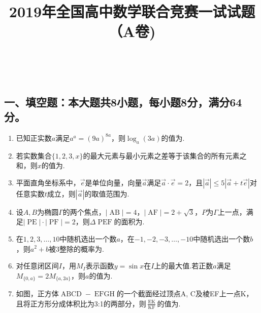 \documentclass[UTF8]{ctexart}
\newcommand{\tmop}[1]{\ensuremath{\operatorname{#1}}}
\begin{document}
\

\title{2019年全国高中数学联合竞赛一试试题（A卷)}

\maketitle

\subsection*{一、填空题：本大题共8小题，每小题8分，满分64分。}

\begin{enumerate}
  \item 已知正实数$a$满足$a^a = (9 a)^{8 a}$，则$\log_a (3
  a)$的值为{\underline{{\hspace{3em}}}}.
  
  \item 若实数集合$\{ 1, 2, 3, x
  \}$的最大元素与最小元素之差等于该集合的所有元素之和，则$x$的值为{\underline{{\hspace{3em}}}}.
  
  \item
  平面直角坐标系中，$\vec{e}$是单位向量，向量$\vec{a}$满足$\vec{a}
  \cdot \vec{e} = 2$，且$| \vec{a} | \leqslant 5 | \vec{a} + t \vec{e}
  |$对任意实数$t$成立，则$| \vec{a}
  |$的取值范围为{\underline{{\hspace{3em}}}}.
  
  \item 设$A, B$为椭圆$\Gamma$的两个焦点，$| \tmop{AB} | = 4$，$|
  \tmop{AF} | = 2 + \sqrt{3}$，$P$为$\Gamma$上一点，满足$| \tmop{PE} |
  \cdot | \tmop{PF} | = 2$，则$\Delta
  \tmop{PEF}$的面积为{\underline{{\hspace{3em}}}}.
  
  \item 在$1, 2, 3, \ldots, 10$中随机选出一个数$a$，在$- 1, - 2, -
  3, \ldots, - 10$中随机选出一个数$b$，则$a^2 +
  b$被3整除的概率为{\underline{{\hspace{3em}}}}.
  
  \item 对任意闭区间$I$，用$M_I$表示函数$y = \sin
  x$在$I$上的最大值.若正数$a$满足$M_{\{ 0, a \}} = 2 M_{\{ a, 2 a
  \}}$，则$a$的值为{\underline{{\hspace{3em}}}}.
  
  \item 如图，正方体$\tmop{ABCD} -
  \tmop{EFGH}$的一个截面经过顶点A,
  C及棱EF上一点K，且将正方形分成体积比为3:1的两部分，则$\frac{\tmop{EK}}{\tmop{KF}}$的值为{\underline{{\hspace{3em}}}}.
  

\end{enumerate}
\end{document}
